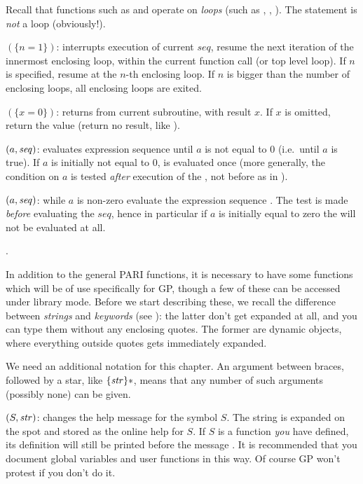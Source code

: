   Recall that functions such as  and  operate on
\emph{loops} (such as , , ). The 
statement is \emph{not} a loop (obviously!).

$(\{n=1\})$: interrupts execution of current $seq$,
resume the next iteration of the innermost enclosing loop, within the
current function call (or top level loop). If $n$ is specified, resume at
the $n$-th enclosing loop. If $n$ is bigger than the number of enclosing
loops, all enclosing loops are exited.

$(\{x=0\})$: returns from current subroutine, with
result $x$. If $x$ is omitted, return the  value (return no
result, like ).

$(a,\hbox{\it seq\/})$: evaluates expression sequence 
until $a$ is not equal to 0 (i.e.~until $a$ is true). If $a$ is initially
not equal to 0,  is evaluated once (more generally, the condition
on $a$ is tested \emph{after} execution of the , not before as in
).

$(a,\hbox{\it seq\/})$: while $a$ is non-zero evaluate the
expression sequence . The test is made \emph{before} evaluating
the $seq$, hence in particular if $a$ is initially equal to zero the
 will not be evaluated at all.\smallskip

.
\label{se:gp_program}

  In addition to the general PARI functions, it is necessary to have some
functions which will be of use specifically for GP, though a few of these can
be accessed under library mode. Before we start describing these, we recall
the difference between \emph{strings} and \emph{keywords} (see
): the latter don't get expanded at all, and you can type
them without any enclosing quotes. The former are dynamic objects, where
everything outside quotes gets immediately expanded.

We need an additional notation for this chapter. An argument between braces,
followed by a star, like $\{\hbox{\it str\/}\}*$, means that any number of such
arguments (possibly none) can be given.

$(S,\hbox{\it str\/})$:\label{se:addhelp} changes the help
message for the symbol $S$. The string  is expanded on the spot
and stored as the online help for $S$. If $S$ is a function \emph{you} have
defined, its definition will still be printed before the message .
It is recommended that you document global variables and user functions in
this way. Of course GP won't protest if you don't do it.

